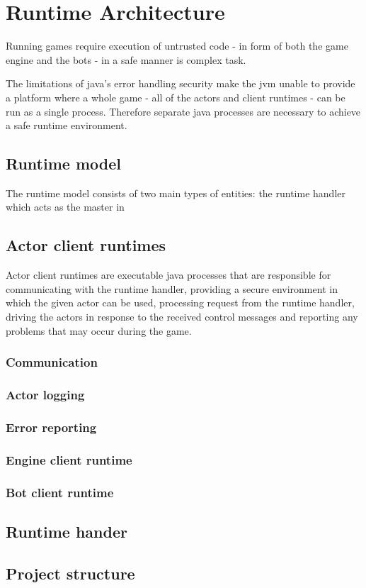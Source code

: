 \documentclass[11pt,a4paper,oneside]{report}
\begin{document}
\chapter{Runtime Architecture}\label{sect:RuntimeArch}

Running games require execution of untrusted code - in form of both the game engine and the bots - in a safe manner is complex task.

The limitations of java's error handling security make the jvm unable to provide a platform where a whole game - all of the actors and client runtimes - can be run as a single process. Therefore separate java processes are necessary to achieve a safe runtime environment. 

	\section{Runtime model}
	
	The runtime model consists of two main types of entities: the runtime handler which acts as the master in 
	
	\section{Actor client runtimes}
	
	Actor client runtimes are executable java processes that are responsible for communicating with the runtime handler, providing a secure environment in which the given actor can be used, processing request from the runtime handler, driving the actors in response to the received control messages and reporting any problems that may occur during the game.
	
		\subsection{Communication}
	
		\subsection{Actor logging}
	
		\subsection{Error reporting}
	
		\subsection{Engine client runtime}
	
		
	
		\subsection{Bot client runtime}
	
	\section{Runtime hander}

	\section{Project structure}
\end{document}
